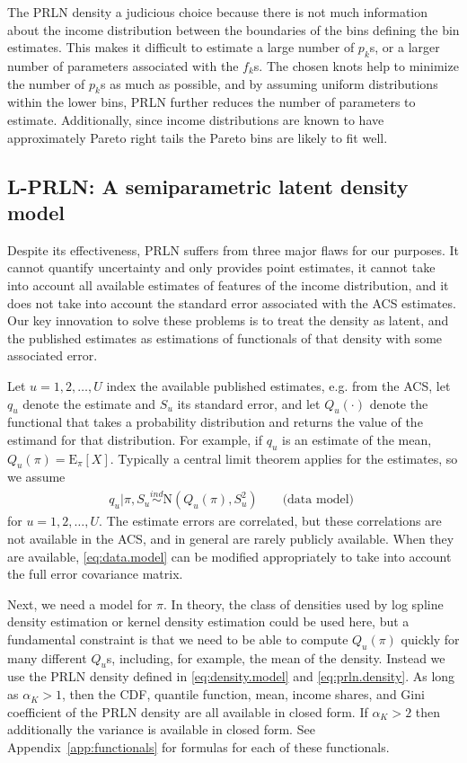 \documentclass[12pt]{article}
\newcommand{\E}{\mathrm{E}}
\begin{document}
The PRLN density a judicious choice because there is not much information about the income distribution between the boundaries of the bins defining the bin estimates. This makes it difficult to estimate a large number of $p_k$s, or a larger number of parameters associated with the $f_k$s. The chosen knots help to minimize the number of $p_k$s as much as possible, and by assuming uniform distributions within the lower bins, PRLN further reduces the number of parameters to estimate. Additionally, since income distributions are known to have approximately Pareto right tails the Pareto bins are likely to fit well.

\subsection{L-PRLN: A semiparametric latent density model}\label{sec:model}
Despite its effectiveness, PRLN suffers from three major flaws for our purposes. It cannot quantify uncertainty and only provides point estimates, it cannot take into account all available estimates of features of the income distribution, and it does not take into account the standard error associated with the ACS estimates. Our key innovation to solve these problems is to treat the density as latent, and the published estimates as estimations of functionals of that density with some associated error. 

Let $u=1,2,\dots,U$ index the available published estimates, e.g. from the ACS, let $q_u$ denote the estimate and $S_u$ its standard error, and let $Q_u(\cdot)$ denote the functional that takes a probability distribution and returns the value of the estimand for that distribution. For example, if $q_u$ is an estimate of the mean, $Q_u(\pi) = \E_{\pi}[X]$. Typically a central limit theorem applies for the estimates, so we assume
\begin{align}
q_u|\pi, S_u \stackrel{ind}{\sim}\mathrm{N}(Q_u(\pi), S_u^2) && \mbox{ (data model) } \label{eq:data.model}
\end{align}
for $u=1,2,\dots,U$. The estimate errors are correlated, but these correlations are not available in the ACS, and in general are rarely publicly available. When they are available, \eqref{eq:data.model} can be modified appropriately to take into account the full error covariance matrix.

Next, we need a model for $\pi$. In theory, the class of densities used by log spline density estimation \citep{stone1994use} or kernel density estimation \citep{scott2015multivariate} could be used here, but a fundamental constraint is that we need to be able to compute $Q_u(\pi)$ quickly for many different $Q_u$s, including, for example, the mean of the density. Instead we use the PRLN density defined in \eqref{eq:density.model} and \eqref{eq:prln.density}. As long as $\alpha_K > 1$, then the CDF, quantile function, mean, income shares, and Gini coefficient of the PRLN density are all available in closed form. If $\alpha_K > 2$ then additionally the variance is available in closed form. See Appendix~\ref{app:functionals} for formulas for each of these functionals.
\end{document}
